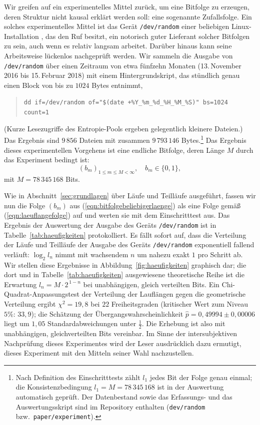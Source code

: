 \documentclass[11pt,a4paper]{scrartcl}
\theoremstyle{plain}
\theoremstyle{definition}
\theoremstyle{remark}
\begin{document}
Wir greifen auf ein experimentelles Mittel zurück, um eine Bitfolge zu
erzeugen, deren Struktur nicht kausal erklärt werden soll: eine
sogenannte Zufallsfolge. Ein solches experimentelles Mittel ist das
Gerät \texttt{/dev/random} einer beliebigen Linux-Installation
\cite{gutterman2004}, das den Ruf besitzt, ein notorisch guter
Lieferant solcher Bitfolgen zu sein, auch wenn es relativ langsam
arbeitet. Darüber hinaus kann seine Arbeitsweise lückenlos nachgeprüft
werden. Wir sammeln die Ausgabe von \texttt{/dev/random} über einen
Zeitraum von etwa fünfzehn Monaten (13.\,November 2016 bis
15.\,Februar 2018) mit einem Hintergrundskript, das stündlich genau
einen Block von bis zu $1024$ Bytes entnimmt,
\begin{quote}
\verb|dd if=/dev/random of="$(date +%Y_%m_%d_%H_%M_%S)" bs=1024 count=1|
\end{quote}
(Kurze Lesezugriffe des Entropie-Pools ergeben gelegentlich kleinere
Dateien.) Das Ergebnis sind $9\,856$ Dateien mit zusammen
$9\,793\,146$ Bytes.\footnote{Nach Definition des Einschritttests
zählt $l_1$ jedes Bit der Folge genau einmal; die
Konsistenzbedingung $l_1=M=78\,345\,168$ ist in der Auswertung
automatisch geprüft. Der Datenbestand sowie das Erfassungs- und das
Auswertungsskript sind im Repository enthalten (\texttt{dev/random}
bzw.\ \texttt{paper/experiment}).}
Das Ergebnis dieses experimentellen Vorgehens ist eine endliche
Bitfolge, deren Länge $M$ durch das Experiment bedingt ist:
\begin{equation}\label{eqn:bitfolgebeliebigerlaenge}
  (b_m)_{1\leq m\leq M<\infty},\quad b_m\in\{0,1\},
\end{equation}
mit $M=78\,345\,168$ Bits.

\noindent Wie in Abschnitt~\ref{sec:grundlagen} über Läufe und
Teilläufe ausgeführt, fassen wir nun die Folge $(b_m)$ aus
(\ref{eqn:bitfolgebeliebigerlaenge}) als eine Folge gemäß
(\ref{eqn:laeuflangefolge}) auf und werten sie mit dem Einschritttest
aus. Das Ergebnis der Auswertung der Ausgabe des Geräts
\texttt{/dev/random} ist in Tabelle~\ref{tab:haeufigkeiten}
protokolliert. Es fällt sofort auf, dass die Verteilung der Läufe und
Teilläufe der Ausgabe des Geräts \texttt{/dev/random} exponentiell
fallend verläuft: $\log_2 l_n$ nimmt mit wachsendem $n$ um nahezu
exakt $1$ pro Schritt ab. Wir stellen diese Ergebnisse in
Abbildung~\ref{fig:haeufigkeiten} graphisch dar; die dort und in
Tabelle~\ref{tab:haeufigkeiten} ausgewiesene theoretische Reihe ist
die Erwartung $l_n=M\cdot 2^{\,1-n}$ bei unabhängigen, gleich
verteilten Bits. Ein Chi-Quadrat-Anpassungstest der Verteilung der
Lauflängen gegen die geometrische Verteilung ergibt $\chi^2=19{,}8$
bei $22$ Freiheitsgraden (kritischer Wert zum Niveau $5\%$:
$33{,}9$); die Schätzung der Übergangswahrscheinlichkeit
$\hat p=0{,}49994\pm 0{,}00006$ liegt um $1{,}05$
Standardabweichungen unter $\tfrac12$. Die Erhebung ist also mit
unabhängigen, gleichverteilten Bits vereinbar. Im Sinne der
intersubjektiven Nachprüfung dieses Experimentes wird der Leser
ausdrücklich dazu ermutigt, dieses Experiment mit den Mitteln seiner
Wahl nachzustellen.
\end{document}
